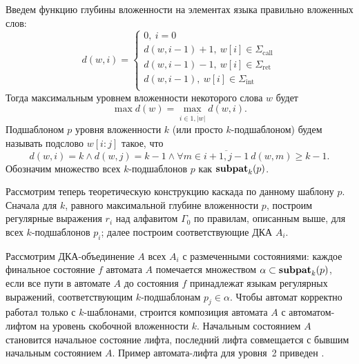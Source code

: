 Введем функцию глубины вложенности на элементах языка правильно вложенных слов:
$$
d(w, i) = \begin{cases}
  0,\ i = 0 \\
  d(w, i-1) + 1,\ w[i] \in \Sigma_{\text{call}} \\
  d(w, i-1) - 1,\ w[i] \in \Sigma_{\text{ret}} \\
  d(w, i-1),\ w[i] \in \Sigma_{\text{int}} \\
\end{cases}
$$
Тогда максимальным уровнем вложенности некоторого слова $w$ будет
$$\max d(w) = \max_{i \in \overline{1,\lvert w\rvert}} d(w, i).$$
Подшаблоном $p$ уровня вложенности $k$ (или просто $k$-подшаблоном) будем называть подслово $w[i:j]$ такое, что
$$
d(w, i) = k \land d(w, j) = k - 1 \land \forall m \in \overline{i+1,j-1} \ d(w, m) \geq k - 1.
$$
Обозначим множество всех $k$-подшаблонов $p$ как $\operatorname{\textbf{subpat}}_k(p)$.

Рассмотрим теперь теоретическую конструкцию каскада по данному шаблону $p$.
Сначала для $k$, равного максимальной глубине вложенности $p$, построим регулярные выражения $r_i$ над алфавитом $\Gamma_0$ по правилам, 
описанным выше, для всех $k$-подшаблонов $p_i$; далее построим соответствующие ДКА $A_i$.

Рассмотрим ДКА-объединение $A$ всех $A_i$ с размеченными состояниями: каждое финальное состояние $f$ автомата $A$ помечается 
множеством $\alpha \subset \operatorname{\textbf{subpat}}_k(p)$, если все пути в автомате $A$ до состояния $f$ принадлежат языкам регулярных выражений, соответствующим $k$-подшаблонам $p_j \in \alpha$. Чтобы автомат корректно работал только с $k$-шаблонами, строится композиция автомата $A$ с автоматом-лифтом на уровень скобочной вложенности $k$. Начальным состоянием $A$ становится начальное состояние лифта, последний  лифта совмещается с бывшим начальным состоянием $A$. Пример автомата-лифта для уровня~2 приведен .

